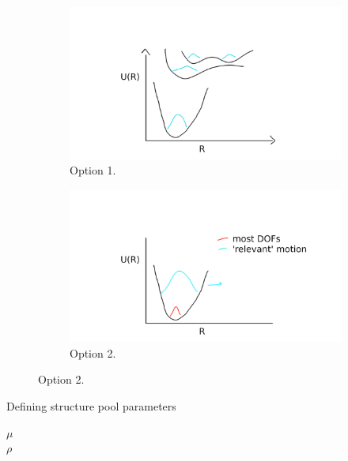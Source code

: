 \documentclass{beamer}
\begin{document}
\begin{frame}
	\begin{figure}
		\centering
	\begin{subfigure}[b]{0.5\textwidth}
		\centering
		\includegraphics[width=\textwidth, trim= 80 10 58 70, clip]{multi_wigner.png}
		\caption{Option 1.}
		\label{fig:nmm-2dplot}
	\end{subfigure}
	\begin{subfigure}[b]{0.5\textwidth}
		\centering
		\includegraphics[width=\textwidth, trim= 80 10 58 70, clip]{modified_wigner.png}
		\caption{Option 2.}
		\label{fig:nmm-2dplot}
	\end{subfigure}
	\end{figure}
\end{frame}

\begin{frame}{Defining structure pool parameters}
\begin{center}
	{\huge$\mu$}\qquad{}\\
	\vspace{2cm}
	{\huge$\rho$}
\end{center}
\end{frame}
\end{document}
